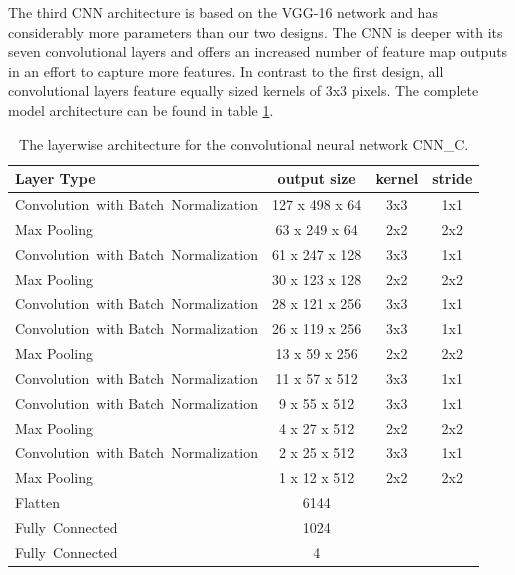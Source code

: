 The third CNN architecture is based on the VGG-16 network\cite{simonyan2014very} and has considerably more parameters than our two designs. The CNN is deeper with its seven convolutional layers and offers an increased number of feature map outputs in an effort to capture more features. In contrast to the first design, all convolutional layers feature equally sized kernels of 3x3 pixels. The complete model architecture can be found in table \ref{tab:layers_CNN_C}.

    
  \begin{table}[]
  \centering
  \begin{tabularx}{\textwidth}{Xccc}
  \toprule
Layer Type                                          & output size    & kernel & stride  \\ \midrule
\mbox{Convolution with} \mbox{Batch Normalization}  & 127 x 498 x 64  & 3x3    & 1x1     \\ 
Max Pooling                                         & 63 x 249 x 64   & 2x2    & 2x2     \\ 
\mbox{Convolution with} \mbox{Batch Normalization}  & 61 x 247 x 128  & 3x3    & 1x1     \\ 
Max Pooling                                         & 30 x 123 x 128  & 2x2    & 2x2     \\ 
\mbox{Convolution with} \mbox{Batch Normalization}  & 28 x 121 x 256  & 3x3    & 1x1     \\ 
\mbox{Convolution with} \mbox{Batch Normalization}  & 26 x 119 x 256  & 3x3    & 1x1     \\ 
Max Pooling                                         & 13 x 59 x 256   & 2x2    & 2x2     \\ 
\mbox{Convolution with} \mbox{Batch Normalization}  & 11 x 57 x 512   & 3x3    & 1x1     \\ 
\mbox{Convolution with} \mbox{Batch Normalization}  & 9 x 55 x 512    & 3x3    & 1x1     \\ 
Max Pooling                                         & 4 x 27 x 512    & 2x2    & 2x2     \\ 
\mbox{Convolution with} \mbox{Batch Normalization}  & 2 x 25 x 512    & 3x3    & 1x1     \\ 
Max Pooling                                         & 1 x 12 x 512    & 2x2    & 2x2     \\ 
Flatten                                             & 6144            &        &         \\                        
\mbox{Fully Connected}                              & 1024            &        &         \\
\mbox{Fully Connected}                              & 4               &        &         \\
  \bottomrule
  \end{tabularx}
  \caption{The layerwise architecture for the convolutional neural network CNN\_C.}
  \label{tab:layers_CNN_C}
  \end{table} 
    

